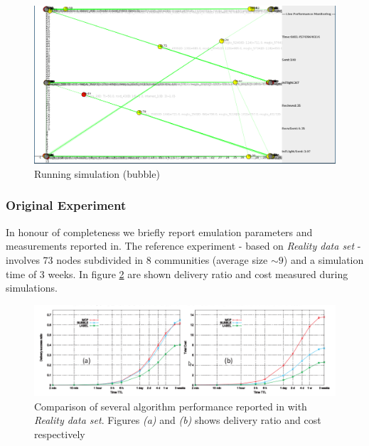 \begin{figure}[h!]
	\begin{center}
    \includegraphics[scale=0.25]{img/bubble_live.png}
    \caption{Running simulation (bubble)}
    \label{fig:bubble_live}
  \end{center}
\end{figure}

\newpage
\subsubsection{Original Experiment}
\label{exp_original}
In honour of completeness we briefly report emulation parameters and measurements reported in\cite[Table 3,6.2]{bubble}. The reference experiment - based on \emph{Reality data set} - involves 73 nodes subdivided in 8 communities (average size $\sim 9$) and a simulation time of 3 weeks. In figure \ref{fig:reality_emulation} are shown delivery ratio and cost measured during simulations.
\begin{center}
\begin{figure}[h!]
    		\includegraphics[scale=0.35]{img/reality_emulation.png}
    		\caption{Comparison of several algorithm performance reported in \cite{bubble} with \emph{Reality data set}. Figures \emph{(a)} and \emph{(b)} shows delivery ratio and cost respectively}
    		\label{fig:reality_emulation}
\end{figure}
\end{center}

